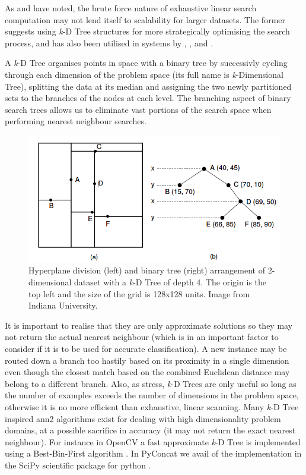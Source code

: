 {{{{{{{As \cite{Collins2007} and \cite{Dannenberg2006} have noted, the brute force nature of exhaustive linear search computation may not lend itself to scalability for larger datasets. The former suggests using \textit{k}-D Tree structures for more strategically optimising the search process, and has also been utilised in systems by \cite{Schwarz2009}, \cite{Einbond2010}, \cite{Stoll2013} and \cite{Klugel2014}.

A \textit{k}-D Tree organises points in space with a binary tree by successivly cycling through each dimension of the problem space (its full name is \textit{k}-Dimensional Tree), splitting the data at its median and assigning the two newly partitioned sets to the branches of the nodes at each level. The branching aspect of binary search trees allows us to eliminate vast portions of the search space when performing nearest neighbour searches. 

\begin{figure}
	\begin{center}
		\includegraphics[width=1.0\textwidth]{ch05_pyconcat/figures/kdTree.png}
	\end{center}
	\caption[]{Hyperplane division (left) and binary tree (right) arrangement of 2-dimensional dataset with a \textit{k}-D Tree of depth 4. The origin is the top left and the size of the grid is 128x128 units. Image from Indiana University.}
	\label{fig:markov_unit}
\end{figure}

It is important to realise that they are only approximate solutions so they may not return the actual nearest neighbour (which is in an important factor to consider if it is to be used for accurate classification). A new instance may be routed down a branch too hastily based on its proximity in a single dimension even though the closest match based on the combined Euclidean distance may  belong to a different branch. Also, as \cite{Russell2002} stress, \textit{k}-D Trees are only useful so long as the number of examples exceeds the number of dimensions in the problem space, otherwise it is no more efficient than exhaustive, linear scanning. Many \textit{k}-D Tree inspired \acrfull{ann2} algorithms exist for dealing with high dimensionality problem domains, at a possible sacrifice in accuracy (it may not return the exact nearest neighbour). For instance in OpenCV a fast approximate \textit{k}-D Tree is implemented using a Best-Bin-First algorithm \citep{kaehler2016learning}. In PyConcat we avail of the implementation in the SciPy scientific package for python \citep{Scipy2014}.

}}}}}}}
